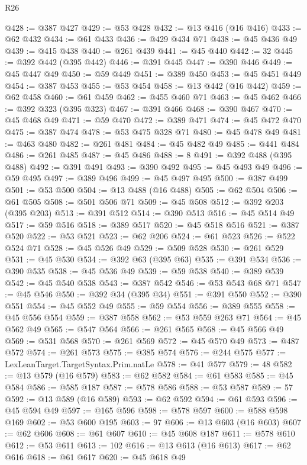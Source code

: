 \begin{lexlean}{R26}
\begin{coremodule}
@428 := @387 @427
@429 := @53 @428
@432 := @13 @416 (@16 @416)
@433 := @62 @432
@434 := @61 @433
@436 := @429 @434 @71
@438 := @45 @436 @49
@439 := @415 @438
@440 := @261 @439
@441 := @45 @440
@442 := 32
@445 := @392 @442 (@395 @442)
@446 := @391 @445
@447 := @390 @446
@449 := @45 @447 @49
@450 := @59 @449
@451 := @389 @450
@453 := @45 @451 @449
@454 := @387 @453
@455 := @53 @454
@458 := @13 @442 (@16 @442)
@459 := @62 @458
@460 := @61 @459
@462 := @455 @460 @71
@463 := @45 @462
@466 := @392 @323 (@395 @323)
@467 := @391 @466
@468 := @390 @467
@470 := @45 @468 @49
@471 := @59 @470
@472 := @389 @471
@474 := @45 @472 @470
@475 := @387 @474
@478 := @53 @475 @328 @71
@480 := @45 @478 @49
@481 := @463 @480
@482 := @261 @481
@484 := @45 @482 @49
@485 := @441 @484
@486 := @261 @485
@487 := @45 @486
@488 := 8
@491 := @392 @488 (@395 @488)
@492 := @391 @491
@493 := @390 @492
@495 := @45 @493 @49
@496 := @59 @495
@497 := @389 @496
@499 := @45 @497 @495
@500 := @387 @499
@501 := @53 @500
@504 := @13 @488 (@16 @488)
@505 := @62 @504
@506 := @61 @505
@508 := @501 @506 @71
@509 := @45 @508
@512 := @392 @203 (@395 @203)
@513 := @391 @512
@514 := @390 @513
@516 := @45 @514 @49
@517 := @59 @516
@518 := @389 @517
@520 := @45 @518 @516
@521 := @387 @520
@522 := @53 @521
@523 := @62 @206
@524 := @61 @523
@526 := @522 @524 @71
@528 := @45 @526 @49
@529 := @509 @528
@530 := @261 @529
@531 := @45 @530
@534 := @392 @63 (@395 @63)
@535 := @391 @534
@536 := @390 @535
@538 := @45 @536 @49
@539 := @59 @538
@540 := @389 @539
@542 := @45 @540 @538
@543 := @387 @542
@546 := @53 @543 @68 @71
@547 := @45 @546
@550 := @392 @34 (@395 @34)
@551 := @391 @550
@552 := @390 @551
@554 := @45 @552 @49
@555 := @59 @554
@556 := @389 @555
@558 := @45 @556 @554
@559 := @387 @558
@562 := @53 @559 @263 @71
@564 := @45 @562 @49
@565 := @547 @564
@566 := @261 @565
@568 := @45 @566 @49
@569 := @531 @568
@570 := @261 @569
@572 := @45 @570 @49
@573 := @487 @572
@574 := @261 @573
@575 := @385 @574
@576 := @244 @575
@577 := LexLeanTarget.TargetSyntax.Prim.natLe
@578 := @41 @577
@579 := 48
@582 := @13 @579 (@16 @579)
@583 := @62 @582
@584 := @61 @583
@585 := @45 @584
@586 := @585 @187
@587 := @578 @586
@588 := @53 @587
@589 := 57
@592 := @13 @589 (@16 @589)
@593 := @62 @592
@594 := @61 @593
@596 := @45 @594 @49
@597 := @165 @596
@598 := @578 @597
@600 := @588 @598 @169
@602 := @53 @600 @195
@603 := 97
@606 := @13 @603 (@16 @603)
@607 := @62 @606
@608 := @61 @607
@610 := @45 @608 @187
@611 := @578 @610
@612 := @53 @611
@613 := 102
@616 := @13 @613 (@16 @613)
@617 := @62 @616
@618 := @61 @617
@620 := @45 @618 @49

\end{coremodule}
\end{lexlean}
